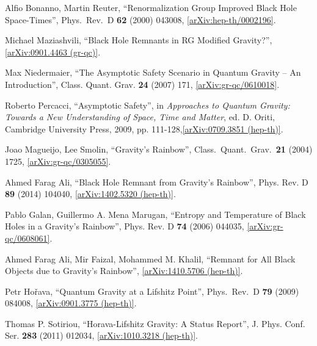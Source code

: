 \documentclass[12pt]{article}
\newcommand{\2}{$^2$}
\newcommand{\3}{$^3$}
\newcommand{\4}{$_4$}
\newcommand{\5}{$_5$}
\begin{document}
\begin{thebibliography}{400}
  Alfio Bonanno, Martin Reuter,
  ``Renormalization Group Improved Black Hole Space-Times'',
  Phys.\ Rev.\ D {\bf 62} (2000) 043008,
  \href{http://arxiv.org/abs/hep-th/0002196}{[arXiv:hep-th/0002196]}.

Michael Maziashvili, ``Black Hole Remnants in RG Modified Gravity?'', \href{http://arxiv.org/abs/0901.4463}{[arXiv:0901.4463 (gr-qc)]}.

Max Niedermaier, ``The Asymptotic Safety Scenario in Quantum Gravity -- An Introduction'', 	Class. Quant. Grav. \textbf{24} (2007) 171, \href{http://arxiv.org/abs/gr-qc/0610018}{[arXiv:gr-qc/0610018]}.

Roberto Percacci, ``Asymptotic Safety'', in \emph{Approaches to Quantum Gravity: Towards a New Understanding of Space, Time and Matter}, ed. D. Oriti, Cambridge University Press, 2009, pp. 111-128,\href{http://arxiv.org/abs/0709.3851}{[arXiv:0709.3851 (hep-th)]}.

Joao Magueijo, Lee Smolin,
  ``Gravity's Rainbow'',
  Class.\ Quant.\ Grav.\  {\bf 21} (2004) 1725,  
  \href{http://arxiv.org/abs/gr-qc/0305055}{[arXiv:gr-qc/0305055]}.

Ahmed Farag Ali, ``Black Hole Remnant from Gravity's Rainbow'', 	Phys. Rev. D \textbf{89} (2014) 104040, \href{http://arxiv.org/abs/1402.5320}{[arXiv:1402.5320 (hep-th)]}.

Pablo Galan, Guillermo A. Mena Marugan, ``Entropy and Temperature of Black Holes in a Gravity's Rainbow'', Phys. Rev. D \textbf{74} (2006) 044035, \href{http://arxiv.org/abs/gr-qc/0608061}{[arXiv:gr-qc/0608061]}.


Ahmed Farag Ali, Mir Faizal, Mohammed M. Khalil, ``Remnant for All Black Objects due to Gravity's Rainbow'', \href{http://arxiv.org/abs/1410.5706}{[arXiv:1410.5706 (hep-th)]}.

  Petr Ho\v{r}ava,
  ``Quantum Gravity at a Lifshitz Point'',
  Phys.\ Rev.\ D {\bf 79} (2009) 084008,
  \href{http://arxiv.org/abs/0901.3775}{[arXiv:0901.3775 (hep-th)]}.
	
Thomas P. Sotiriou,
``Horava-Lifshitz Gravity: A Status Report'',  	J. Phys. Conf. Ser. \textbf{283} (2011) 012034, \href{http://arxiv.org/abs/1010.3218}{[arXiv:1010.3218 (hep-th)]}.


\end{thebibliography}
\end{document}
